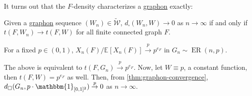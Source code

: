 It turns out that the \(F\)-density characterizes a \hyperref[def:graphon]{graphon} exactly:

\begin{theorem}\label{thm:graphon-convergence}
	Given a \hyperref[def:graphon]{graphon} sequence \((W_n) \in \widetilde{\mathcal{W}} \), \(d_{\square}(W_n, W) \to 0\) as \(n \to \infty \) if and only if \(t(F, W_n) \to t(F, W)\) for all finite connected graph \(F\).
\end{theorem}

\begin{prev}
	For a fixed \(p \in (0, 1)\), \(X_n(F) / \mathbb{E}_{}[X_n(F)] \overset{p}{\to} p^{e_F}\) in \(G_n \sim \operatorname{ER}(n, p) \).
\end{prev}

The above is equivalent to \(t(F, G_n) \overset{p}{\to} p^{e_F}\). Now, let \(W \equiv p\), a constant function, then \(t(F, W) = p^{e_F}\) as well. Then, from \autoref{thm:graphon-convergence}, \(d_{\square} (G_n, p \cdot \mathbbm{1}_{[0, 1]^2} ) \overset{p}{\to} 0\) as \(n \to \infty \).